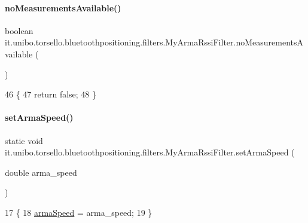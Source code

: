 \paragraph{\texorpdfstring{no\+Measurements\+Available()}{noMeasurementsAvailable()}}
{\footnotesize\ttfamily boolean it.\+unibo.\+torsello.\+bluetoothpositioning.\+filters.\+My\+Arma\+Rssi\+Filter.\+no\+Measurements\+Available (\begin{DoxyParamCaption}{ }\end{DoxyParamCaption})}


\begin{DoxyCode}
46                                              \{
47         \textcolor{keywordflow}{return} \textcolor{keyword}{false};
48     \}
\end{DoxyCode}
\hypertarget{classit_1_1unibo_1_1torsello_1_1bluetoothpositioning_1_1filters_1_1MyArmaRssiFilter_aba1608e8dede3a85c42c084ac6326851_aba1608e8dede3a85c42c084ac6326851}{}\label{classit_1_1unibo_1_1torsello_1_1bluetoothpositioning_1_1filters_1_1MyArmaRssiFilter_aba1608e8dede3a85c42c084ac6326851_aba1608e8dede3a85c42c084ac6326851} 
\paragraph{\texorpdfstring{set\+Arma\+Speed()}{setArmaSpeed()}}
{\footnotesize\ttfamily static void it.\+unibo.\+torsello.\+bluetoothpositioning.\+filters.\+My\+Arma\+Rssi\+Filter.\+set\+Arma\+Speed (\begin{DoxyParamCaption}\item[{double}]{arma\+\_\+speed }\end{DoxyParamCaption})\hspace{0.3cm}{\ttfamily [static]}}


\begin{DoxyCode}
17                                                        \{
18         \hyperlink{classit_1_1unibo_1_1torsello_1_1bluetoothpositioning_1_1filters_1_1MyArmaRssiFilter_a55fe96a8f80f6ec634e4f9f9e2e337f8_a55fe96a8f80f6ec634e4f9f9e2e337f8}{armaSpeed} = arma\_speed;
19     \}
\end{DoxyCode}


